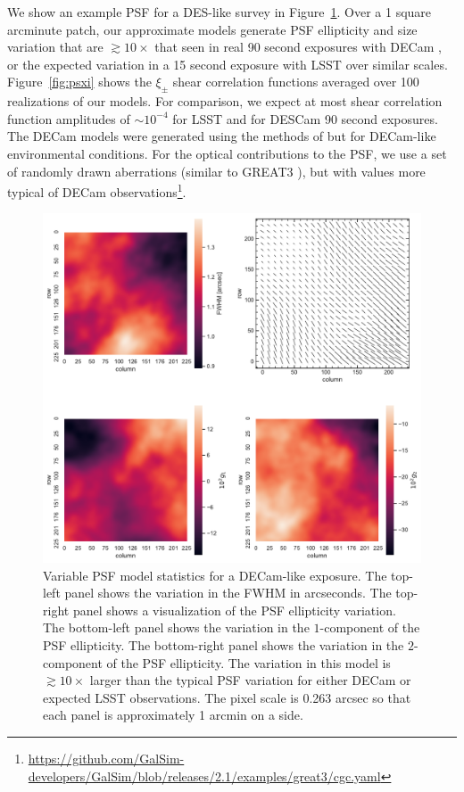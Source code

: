 \documentclass[iop, appendixfloats, numberedappendix, apj]{emulateapj}
\begin{document}
We show an example PSF for a DES-like survey in Figure~\ref{fig:pspsf}.  Over a
1 square arcminute patch, our approximate models generate PSF ellipticity and size
variation that are $\gtrsim10\times$ that seen in real 90 second exposures
with DECam \citep{DESY1shear}, or the expected variation in a 15 second exposure with
LSST \citep{jee2011} over similar scales. Figure~\ref{fig:psxi} shows the $\xi_{\pm}$ shear correlation
functions averaged over 100 realizations of our models. For comparison, we
expect at most shear correlation function amplitudes of $\sim10^{-4}$ for LSST
\citep{jee2011} and for DESCam 90 second exposures. The DECam models were generated
using the methods of \citet{jee2011} but for DECam-like environmental conditions. For
the optical contributions to the PSF, we use a set of randomly drawn
aberrations (similar to GREAT3 \citep{great3}), but with values more typical of
DECam observations\footnote{\url{https://github.com/GalSim-developers/GalSim/blob/releases/2.1/examples/great3/cgc.yaml}}.

\begin{figure}
    \begin{center}
        \includegraphics[width=\textwidth]{figures/pspsf.pdf}
        \caption{
            Variable PSF model statistics for a DECam-like exposure. The top-left
        panel shows the variation in the FWHM in arcseconds. The top-right panel
        shows a visualization of the PSF ellipticity variation. The bottom-left panel shows
        the variation in the $1$-component of the PSF ellipticity. The bottom-right panel
        shows the variation in the $2$-component of the PSF ellipticity. The variation in
        this model is $\gtrsim10\times$ larger than the typical PSF variation for
        either DECam or expected LSST observations. The pixel scale is 0.263 arcsec
        so that each panel is approximately 1 arcmin on a side.
        \label{fig:pspsf}}
    \end{center}
\end{figure}
\end{document}

